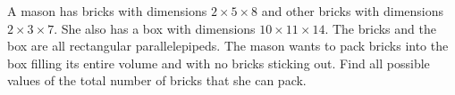 A mason has bricks with dimensions $2\times5\times8$ and other bricks with dimensions $2\times3\times7$. She also has a box with dimensions $10\times11\times14$. The bricks and the box are all rectangular parallelepipeds. The mason wants to pack bricks into the box filling its entire volume and with no bricks sticking out.
Find all possible values of the total number of bricks that she can pack.